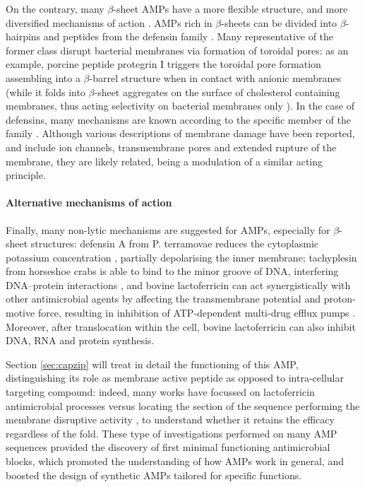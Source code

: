 On the contrary, many $\beta$-sheet AMPs have a more flexible structure, and more diversified mechanisms of action \citep{Nguyen2011,Mahlapuu2016}.
%
AMPs rich in $\beta$-sheets can be divided into $\beta$-hairpins and peptides from the defensin family \citep{Nguyen2011}.
%
Many representative of the former class disrupt bacterial membranes via formation of toroidal pores: as an example, porcine peptide protegrin I triggers the toroidal pore formation assembling into a $\beta$-barrel structure when in contact with anionic membranes (while it folds into $\beta$-sheet aggregates on the surface of cholesterol containing membranes, thus acting selectivity on bacterial membranes only \citep{Tang2009}).
%
In the case of defensins, many mechanisms are known according to the specific member of the family \citep{Lehrer2004,Kagan1990,Takeuchi2004}.
%
Although various descriptions of membrane damage have been reported, and include ion channels, transmembrane pores and extended rupture of the membrane, they are likely related, being a modulation of a similar acting principle.


\paragraph{Alternative mechanisms of action} Finally, many non-lytic mechanisms are suggested for AMPs, especially for $\beta$-sheet structures: defensin A from P. terramovae reduces the cytoplasmic potassium concentration \citep{Brogden2005}, partially depolarising the inner membrane; tachyplesin from horseshoe crabs is able to bind to the minor groove of DNA, interfering DNA–protein interactions \citep{Yonezawa1992},
%
and bovine lactoferricin can act synergistically with other antimicrobial agents by affecting the transmembrane potential and proton-motive force, resulting in inhibition of ATP-dependent multi-drug efflux pumps \citep{Gifford2005}.
%
Moreover, after translocation within the cell, bovine lactoferricin can also inhibit DNA, RNA and protein synthesis.

Section \ref{sec:capzip} will treat in detail the functioning of this AMP, distinguishing its role as membrane active peptide as opposed to intra-cellular targeting compound: indeed, many works have focussed on lactoferricin antimicrobial processes versus locating the section of the sequence performing the membrane disruptive activity \citep{Tomita1994,Schibli1999}, to understand whether it retains the efficacy regardless of the fold.
%
These type of investigations performed on many AMP sequences provided the discovery of first minimal functioning antimicrobial blocks, which promoted the understanding of how AMPs work in general, and boosted the design of synthetic AMPs tailored for specific functions.


